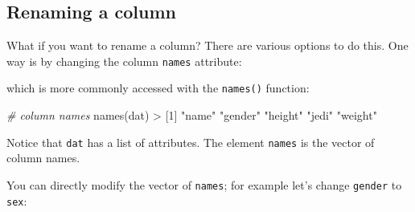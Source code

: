 \documentclass[
]{book}
\newenvironment{Shaded}{\begin{snugshade}}{\end{snugshade}}
\newcommand{\CommentTok}[1]{\textcolor[rgb]{0.56,0.35,0.01}{\textit{#1}}}
\newcommand{\DecValTok}[1]{\textcolor[rgb]{0.00,0.00,0.81}{#1}}
\newcommand{\ErrorTok}[1]{\textcolor[rgb]{0.64,0.00,0.00}{\textbf{#1}}}
\newcommand{\FunctionTok}[1]{\textcolor[rgb]{0.00,0.00,0.00}{#1}}
\newcommand{\NormalTok}[1]{#1}
\newcommand{\OtherTok}[1]{\textcolor[rgb]{0.56,0.35,0.01}{#1}}
\newcommand{\SpecialCharTok}[1]{\textcolor[rgb]{0.00,0.00,0.00}{#1}}
\newcommand{\StringTok}[1]{\textcolor[rgb]{0.31,0.60,0.02}{#1}}
\begin{document}
\hypertarget{renaming-a-column}{%
\subsection{Renaming a column}\label{renaming-a-column}}

What if you want to rename a column? There are various options to do this.
One way is by changing the column \texttt{names} attribute:

\begin{Shaded}
\end{Shaded}

which is more commonly accessed with the \texttt{names()} function:

\begin{Shaded}
\begin{Highlighting}[]
\CommentTok{\# column names}
\FunctionTok{names}\NormalTok{(dat)}
\SpecialCharTok{\textgreater{}}\NormalTok{ [}\DecValTok{1}\NormalTok{] }\StringTok{"name"}   \StringTok{"gender"} \StringTok{"height"} \StringTok{"jedi"}   \StringTok{"weight"}
\end{Highlighting}
\end{Shaded}

Notice that \texttt{dat} has a list of attributes. The element \texttt{names} is the vector
of column names.

You can directly modify the vector of \texttt{names}; for example let's change
\texttt{gender} to \texttt{sex}:

\begin{Shaded}
\end{Shaded}
\end{document}
